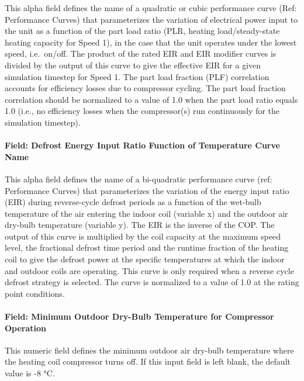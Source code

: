 This alpha field defines the name of a quadratic or cubic performance curve (Ref: Performance Curves) that parameterizes the variation of electrical power input to the unit as a function of the part load ratio (PLR, heating load/steady-state heating capacity for Speed 1), in the case that the unit operates under the lowest speed, i.e.~on/off. The product of the rated EIR and EIR modifier curves is divided by the output of this curve to give the effective EIR for a given simulation timestep for Speed 1. The part load fraction (PLF) correlation accounts for efficiency losses due to compressor cycling. The part load fraction correlation should be normalized to a value of 1.0 when the part load ratio equals 1.0 (i.e., no efficiency losses when the compressor(s) run continuously for the simulation timestep).

\paragraph{Field: Defrost Energy Input Ratio Function of Temperature Curve Name}\label{field-defrost-energy-input-ratio-function-of-temperature-curve-name-2}

This alpha field defines the name of a bi-quadratic performance curve (ref: Performance Curves) that parameterizes the variation of the energy input ratio (EIR) during reverse-cycle defrost periods as a function of the wet-bulb temperature of the air entering the indoor coil (variable x) and the outdoor air dry-bulb temperature (variable y). The EIR is the inverse of the COP. The output of this curve is multiplied by the coil capacity at the maximum speed level, the fractional defrost time period and the runtime fraction of the heating coil to give the defrost power at the specific temperatures at which the indoor and outdoor coils are operating. This curve is only required when a reverse cycle defrost strategy is selected. The curve is normalized to a value of 1.0 at the rating point conditions.

\paragraph{Field: Minimum Outdoor Dry-Bulb Temperature for Compressor Operation}\label{field-minimum-outdoor-dry-bulb-temperature-for-compressor-operation-2}

This numeric field defines the minimum outdoor air dry-bulb temperature where the heating coil compressor turns off. If this input field is left blank, the default value is -8 °C.

